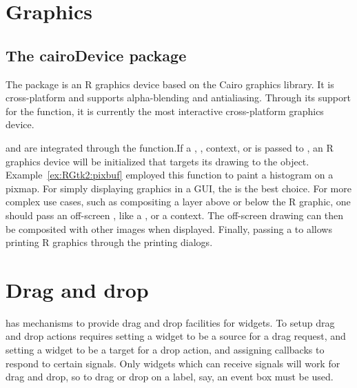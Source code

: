\section{Graphics}


\subsection{The cairoDevice package}
\label{sec:cairodevice-package}

The package  is an R graphics device based on the
Cairo graphics library.  It is cross-platform and supports
alpha-blending and antialiasing. Through its support for the
 function, it is currently the most
interactive cross-platform graphics device.  

 and  are integrated through the
 function.If a ,
,  context, or 
is passed to , an R graphics device will be
initialized that targets its drawing to the
object. Example~\ref{ex:RGtk2:pixbuf} employed this function to paint
a histogram on a pixmap.  For simply displaying graphics in a GUI, the
 is the best choice.
For more complex use cases, such as compositing a layer above
or below the R graphic, one should pass an off-screen
, like a , or a 
context. The off-screen drawing can then be composited with other
images when displayed. Finally, passing a  to
 allows printing R graphics through the \GTK\/
printing dialogs.



\section{Drag and drop}
\label{sec:RGtk2:dnd}


\GTK\/ has mechanisms to provide drag and drop facilities for
widgets. To setup drag and drop actions requires setting a widget to
be a source for a drag request, and setting a widget to be a target
for a drop action, and assigning callbacks to respond to certain
signals.  Only widgets which can receive signals will work for drag
and drop, so to drag or drop on a label, say, an event box must be
used. 

